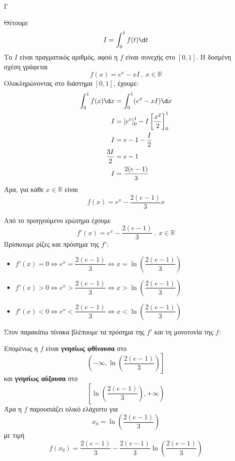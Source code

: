 \begin{thema}{Γ}
\begin{erwthma}
\item Θέτουμε
\[I=\dint_0^1 f(t)\d t\]
Το $I$ είναι πραγματικός αριθμός, αφού η $f$ είναι συνεχής στο $[0,1]$. Η δοσμένη σχέση γράφεται
\[f(x)=e^x-xI\ ,\ x\in\mathbb{R}\]
Ολοκληρώνοντας στο διάστημα $[0,1]$, έχουμε:
\begin{align*}
\dint_0^1 f(x)\d x&=\dint_0^1(e^x-xI)\d x\\
I&=\left[e^x\right]_0^1-I\left[\frac{x^2}{2}\right]_0^1\\
I&=e-1-\frac{I}{2}\\
\frac{3I}{2}&=e-1\\
I&=\frac{2(e-1)}{3}
\end{align*}
Άρα, για κάθε $x\in\mathbb{R}$ είναι
\[f(x)=e^x-\frac{2(e-1)}{3}x\]

\item Από το προηγούμενο ερώτημα έχουμε
\[f'(x)=e^x-\frac{2(e-1)}{3}\ ,\ x\in\mathbb{R}\]
Βρίσκουμε ρίζες και πρόσημα της $f'$:
\begin{itemize}
\item $f'(x)=0\Leftrightarrow e^x=\dfrac{2(e-1)}{3}\Leftrightarrow x=\ln\left(\dfrac{2(e-1)}{3}\right)$
\item $f'(x)>0\Leftrightarrow e^x>\dfrac{2(e-1)}{3}\Leftrightarrow x>\ln\left(\dfrac{2(e-1)}{3}\right)$
\item $f'(x)<0\Leftrightarrow e^x<\dfrac{2(e-1)}{3}\Leftrightarrow x<\ln\left(\dfrac{2(e-1)}{3}\right)$
\end{itemize}
Στον παρακάτω πίνακα βλέπουμε τα πρόσημα της $f'$ και τη μονοτονία της $f$:
\begin{center}
\end{center}
Επομένως η $f$ είναι \textbf{γνησίως φθίνουσα} στο
\[\left(-\infty,\ln\left(\frac{2(e-1)}{3}\right)\right]\]
και \textbf{γνησίως αύξουσα} στο
\[\left[\ln\left(\frac{2(e-1)}{3}\right),+\infty\right)\]
Άρα η $f$ παρουσιάζει ολικό ελάχιστο για
\[x_0=\ln\left(\frac{2(e-1)}{3}\right)\]
με τιμή
\[f(x_0)=\frac{2(e-1)}{3}-\frac{2(e-1)}{3}\ln\left(\frac{2(e-1)}{3}\right)\]


\end{erwthma}
\end{thema}
